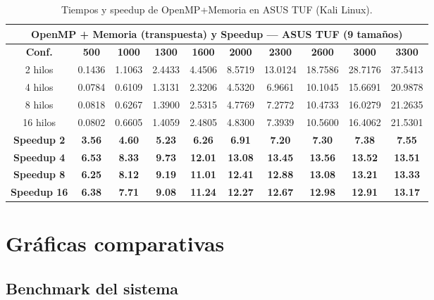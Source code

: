 \documentclass{article}
\begin{document}
\begin{table}[H]
\centering
\tiny
\begin{tabular}{|c|c|c|c|c|c|c|c|c|c|}
\hline
\multicolumn{10}{|c|}{\textbf{OpenMP + Memoria (transpuesta) y Speedup --- ASUS TUF (9 tamaños)}} \\
\hline
\textbf{Conf.} & \textbf{500} & \textbf{1000} & \textbf{1300} & \textbf{1600} & \textbf{2000} & \textbf{2300} & \textbf{2600} & \textbf{3000} & \textbf{3300} \\
\hline
2 hilos & 0.1436 & 1.1063 & 2.4433 & 4.4506 & 8.5719 & 13.0124 & 18.7586 & 28.7176 & 37.5413 \\
4 hilos & 0.0784 & 0.6109 & 1.3131 & 2.3206 & 4.5320 & 6.9661 & 10.1045 & 15.6691 & 20.9878 \\
8 hilos & 0.0818 & 0.6267 & 1.3900 & 2.5315 & 4.7769 & 7.2772 & 10.4733 & 16.0279 & 21.2635 \\
16 hilos & 0.0802 & 0.6605 & 1.4059 & 2.4805 & 4.8300 & 7.3939 & 10.5600 & 16.4062 & 21.5301 \\
\hline
\textbf{Speedup 2} & \textbf{3.56} & \textbf{4.60} & \textbf{5.23} & \textbf{6.26} & \textbf{6.91} & \textbf{7.20} & \textbf{7.30} & \textbf{7.38} & \textbf{7.55} \\
\textbf{Speedup 4} & \textbf{6.53} & \textbf{8.33} & \textbf{9.73} & \textbf{12.01} & \textbf{13.08} & \textbf{13.45} & \textbf{13.56} & \textbf{13.52} & \textbf{13.51} \\
\textbf{Speedup 8} & \textbf{6.25} & \textbf{8.12} & \textbf{9.19} & \textbf{11.01} & \textbf{12.41} & \textbf{12.88} & \textbf{13.08} & \textbf{13.21} & \textbf{13.33} \\
\textbf{Speedup 16} & \textbf{6.38} & \textbf{7.71} & \textbf{9.08} & \textbf{11.24} & \textbf{12.27} & \textbf{12.67} & \textbf{12.98} & \textbf{12.91} & \textbf{13.17} \\
\hline
\end{tabular}
\caption{Tiempos y speedup de OpenMP+Memoria en ASUS TUF (Kali Linux).}
\label{tab:ompm_kali}
\end{table}

\section{Gráficas comparativas}

\subsection{Benchmark del sistema}
\end{document}
